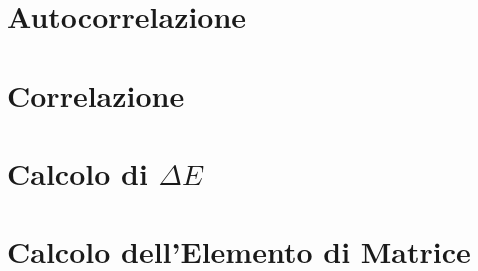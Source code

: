 \section{Autocorrelazione}
\section{Correlazione}
\section{Calcolo di $\Delta E$}
\section{Calcolo dell'Elemento di Matrice}


